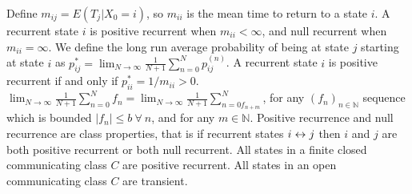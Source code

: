  Define $m_{ij} = E(T_j|X_0 = i)$, so $m_{ii}$ is the mean time to return to a state $i$. A recurrent state $i$ is positive recurrent when $m_{ii} < \infty$, and null recurrent when $m_{ii} = \infty$.
 We define the long run average probability of being at state $j$ starting at state $i$ as $p^*_{ij} = \lim_{N \to \infty} \frac{1}{N+1}\sum^N_{n=0} p^{(n)}_{ij}$.
 A recurrent state $i$ is positive recurrent if and only if $p^{*}_{ii} = 1/m_{ii} > 0$.
 $\lim_{N \to \infty} \frac{1}{N+1}\sum^N_{n=0} f_n =  \lim_{N \to \infty} \frac{1}{N+1}\sum^N_{n=0 f_{n+m}}$, for any $(f_n)_{n \in \mathbb{N}}$ sequence which is bounded $|f_n| \le b\ \forall\ n$, and for any $m \in \mathbb{N}$.
 Positive recurrence and null recurrence are class properties, that is if recurrent states $i \leftrightarrow j$ then $i$ and $j$ are both positive recurrent or both null recurrent.
 All states in a finite closed communicating class $C$ are positive recurrent.
 All states in an open communicating class $C$ are transient.